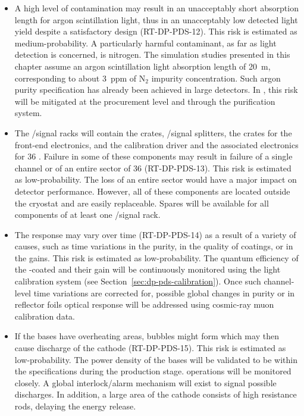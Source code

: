\begin{itemize}

\item A high level of  contamination may result in an unacceptably short absorption length for argon scintillation light, thus in an unacceptably low detected light yield despite a satisfactory  design (RT-DP-PDS-12). This risk is estimated as medium-probability. A particularly harmful contaminant, as far as light detection is concerned, is nitrogen. The simulation studies presented in this chapter assume an argon scintillation light absorption length of \SI{20}{m}, corresponding to about \SI{3}{ppm} of N$_2$ impurity concentration. Such argon purity specification has already been achieved in large  detectors. In \dune \dual, this risk will be mitigated at the \lar procurement level and through the purification system.

\item The /signal racks will contain the  crates, /signal splitters, the  crates for the front-end electronics, and the calibration  driver and the associated electronics for \num{36} . Failure in some of these components may result in failure of a single  channel or of an entire sector of \num{36}  (RT-DP-PDS-13). This risk is estimated as low-probability. The loss of an entire  sector would have a major impact on detector performance. However, all of these components are located outside the cryostat and are easily replaceable. Spares will be available for all components of at least one /signal rack.

\item The  response may vary over time (RT-DP-PDS-14) as a result of a variety of causes, such as time variations in the  purity, in the quality of  coatings, or in the  gains. This risk is estimated as low-probability. The quantum efficiency of the -coated  and their gain will be continuously monitored using the light calibration system (see Section~\ref{sec:dp-pds-calibration}). Once such channel-level time variations are corrected for, possible global changes in  purity or in  reflector foils optical response will be addressed using cosmic-ray muon calibration data. 

\item If the  bases have overheating areas, bubbles might form which may then cause  discharge of the cathode (RT-DP-PDS-15). This risk is estimated as low-probability. The power density of the  bases will be validated to be within the specifications during the production stage.  operations will be monitored closely. A global interlock/alarm mechanism will exist to signal possible discharges. In addition, a large area of the cathode consists of high resistance rods, delaying the energy release.  


\end{itemize}
